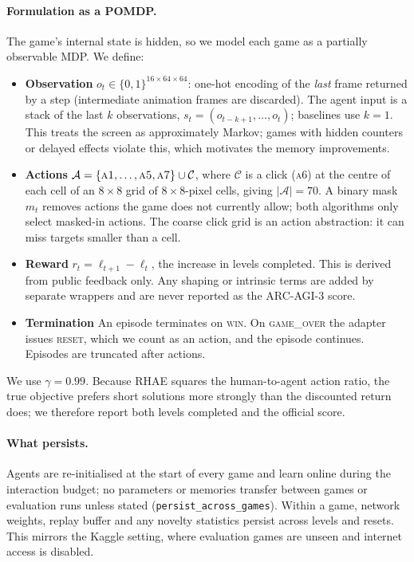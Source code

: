 \paragraph{Formulation as a POMDP.} The game's internal state is hidden, so
we model each game as a partially observable MDP. We define:
\begin{itemize}
  \item \textbf{Observation} $o_t \in \{0,1\}^{16\times64\times64}$: one-hot
        encoding of the \emph{last} frame returned by a step (intermediate
        animation frames are discarded). The agent input is a stack of the last
        $k$ observations, $s_t = (o_{t-k+1},\dots,o_t)$; baselines use $k=1$.
        This treats the screen as approximately Markov; games with hidden
        counters or delayed effects violate this, which motivates the memory
        improvements.
  \item \textbf{Actions} $\mathcal{A} = \{\textsc{a1},\dots,\textsc{a5},
        \textsc{a7}\} \cup \mathcal{C}$, where $\mathcal{C}$ is a click
        (\textsc{a6}) at the centre of each cell of an $8\times8$ grid of
        $8\times8$-pixel cells, giving $|\mathcal{A}|=70$. A binary mask
        $m_t$ removes actions the game does not currently allow; both
        algorithms only select masked-in actions. The coarse click grid is an
        action abstraction: it can miss targets smaller than a cell.
  \item \textbf{Reward} $r_t = \ell_{t+1} - \ell_t$, the increase in levels
        completed. This is derived from public feedback only. Any shaping or
        intrinsic terms are added by separate wrappers and are never reported
        as the ARC-AGI-3 score.
  \item \textbf{Termination} An episode terminates on \textsc{win}. On
        \textsc{game\_over} the adapter issues \textsc{reset}, which we count as
        an action, and the episode continues. Episodes are truncated after
         actions.
\end{itemize}
We use $\gamma=0.99$. Because RHAE squares the human-to-agent action ratio,
the true objective prefers short solutions more strongly than the discounted
return does; we therefore report both levels completed and the official score.

\paragraph{What persists.} Agents are re-initialised at the start of every
game and learn online during the interaction budget; no parameters or memories
transfer between games or evaluation runs unless stated
(\texttt{persist\_across\_games}). Within a game, network weights, replay
buffer and any novelty statistics persist across levels and resets. This
mirrors the Kaggle setting, where evaluation games are unseen and internet
access is disabled.

